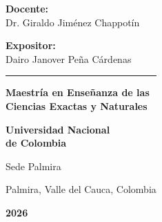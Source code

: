 \begin{frame}[plain]
\begin{columns}[T]

\vspace{0.5cm}

\begin{tcolorbox}[colback=VerdeUNAL!10,colframe=VerdeUNAL!90,boxrule=1.5pt,arc=3mm,title={\centering\small\textbf{Información Académica}}]

{\small \textbf{Docente:}\\[0.05cm]
Dr. Giraldo Jiménez Chappotín}

\vspace{0.35cm}

{\small \textbf{Expositor:}\\[0.05cm]
Dairo Janover Peña Cárdenas}

\vspace{0.35cm}

\textcolor{VerdeUNAL}{\rule{\textwidth}{1pt}}

\vspace{0.2cm}

\centering
{\scriptsize \textbf{Maestría en Enseñanza de las\\Ciencias Exactas y Naturales}}

\vspace{0.2cm}

{\footnotesize \textbf{Universidad Nacional\\de Colombia}}

\vspace{0.15cm}

{\scriptsize Sede Palmira}

\vspace{0.2cm}

{\tiny Palmira, Valle del Cauca, Colombia}

\vspace{0.25cm}

{\large \textcolor{VerdeUNAL}{\textbf{2026}}}
\end{tcolorbox}

\vspace{0.2cm}

\begin{center}
\textcolor{VerdeUNAL}{\large {}  }
\end{center}

\end{columns}

\end{frame}
